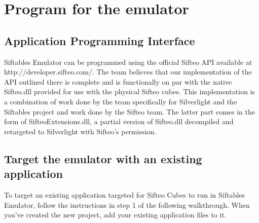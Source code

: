 \documentclass[12pt]{article}
\begin{document}
\section{Program for the emulator}
\subsection{Application Programming Interface}
Siftables Emulator can be programmed using the official Sifteo API available at\\ http://developer.sifteo.com/. The team believes that our implementation of the API outlined there is complete and is functionally on par with the native Sifteo.dll provided for use with the physical Sifteo cubes. This implementation is a combination of work done by the team specifically for Silverlight and the Siftables project and work done by the Sifteo team. The latter part comes in the form of SifteoExtensions.dll, a partial version of Sifteo.dll decompiled and retargeted to Silverlight with Sifteo's permission.

\subsection{Target the emulator with an existing application}
To target an existing application targeted for Sifteo Cubes to run in Siftables Emulator, follow the instructions in step 1 of the following walkthrough. When you've created the new project, add your existing application files to it.
\end{document}
